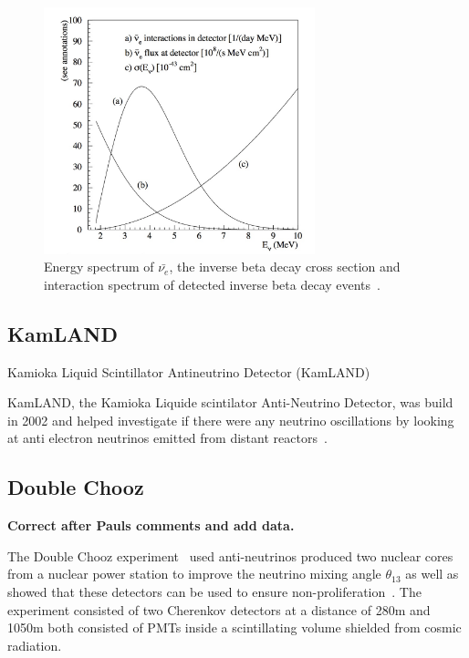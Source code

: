 \begin{figure}[h!]
\centering
  \centering
\includegraphics[width=0.7\textwidth]{figures/reactor.jpeg}
\vspace{2mm}
\caption{Energy spectrum of $\bar{\nu_e}$, the inverse beta decay cross section and interaction spectrum of detected inverse beta decay events~\cite{65Reactor}.}
\label{fig:reactor}
\end{figure}

\subsection{KamLAND}
Kamioka Liquid Scintillator Antineutrino Detector (KamLAND)

KamLAND, the Kamioka Liquide scintilator Anti-Neutrino Detector, was build in 2002 and helped investigate if there were any neutrino oscillations by looking at anti electron neutrinos emitted from distant reactors~\cite{46KamLAND}.

\subsection{Double Chooz}
\textbf{Correct after Pauls comments and add data.}

The Double Chooz experiment~\cite{45DoubleChooz} used anti-neutrinos produced two nuclear cores from a nuclear power station to improve the neutrino mixing angle $\theta_{13}$ as well as showed that these detectors can be used to ensure non-proliferation~\cite{66ReactorNP}. The experiment consisted of two Cherenkov detectors at a distance of 280m and 1050m both consisted of PMTs inside a scintillating volume shielded from cosmic radiation. 

